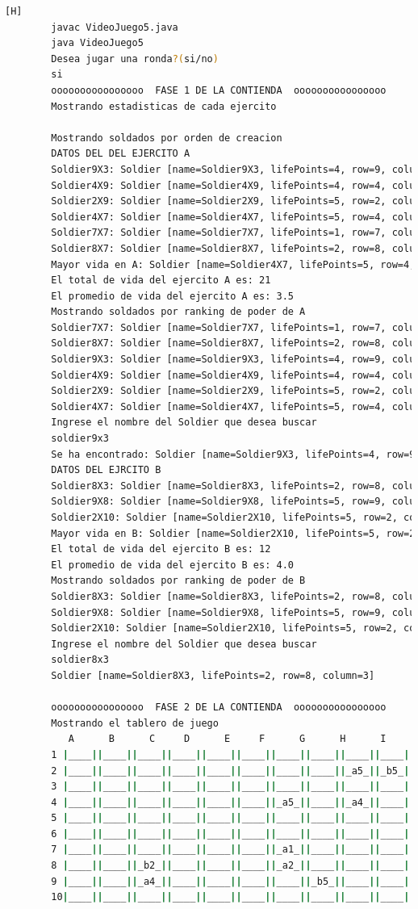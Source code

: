 \documentclass{article}
\begin{document}
		\begin{lstlisting}[language=bash,caption={Compilando y probando el codigo en su versión final }][H]
		javac VideoJuego5.java
		java VideoJuego5
		Desea jugar una ronda?(si/no)
		si
		oooooooooooooooo  FASE 1 DE LA CONTIENDA  oooooooooooooooo
		Mostrando estadisticas de cada ejercito
		
		Mostrando soldados por orden de creacion
		DATOS DEL DEL EJERCITO A
		Soldier9X3: Soldier [name=Soldier9X3, lifePoints=4, row=9, column=3]
		Soldier4X9: Soldier [name=Soldier4X9, lifePoints=4, row=4, column=9]
		Soldier2X9: Soldier [name=Soldier2X9, lifePoints=5, row=2, column=9]
		Soldier4X7: Soldier [name=Soldier4X7, lifePoints=5, row=4, column=7]
		Soldier7X7: Soldier [name=Soldier7X7, lifePoints=1, row=7, column=7]
		Soldier8X7: Soldier [name=Soldier8X7, lifePoints=2, row=8, column=7]
		Mayor vida en A: Soldier [name=Soldier4X7, lifePoints=5, row=4, column=7]
		El total de vida del ejercito A es: 21
		El promedio de vida del ejercito A es: 3.5
		Mostrando soldados por ranking de poder de A
		Soldier7X7: Soldier [name=Soldier7X7, lifePoints=1, row=7, column=7]
		Soldier8X7: Soldier [name=Soldier8X7, lifePoints=2, row=8, column=7]
		Soldier9X3: Soldier [name=Soldier9X3, lifePoints=4, row=9, column=3]
		Soldier4X9: Soldier [name=Soldier4X9, lifePoints=4, row=4, column=9]
		Soldier2X9: Soldier [name=Soldier2X9, lifePoints=5, row=2, column=9]
		Soldier4X7: Soldier [name=Soldier4X7, lifePoints=5, row=4, column=7]
		Ingrese el nombre del Soldier que desea buscar
		soldier9x3
		Se ha encontrado: Soldier [name=Soldier9X3, lifePoints=4, row=9, column=3]
		DATOS DEL EJRCITO B
		Soldier8X3: Soldier [name=Soldier8X3, lifePoints=2, row=8, column=3]
		Soldier9X8: Soldier [name=Soldier9X8, lifePoints=5, row=9, column=8]
		Soldier2X10: Soldier [name=Soldier2X10, lifePoints=5, row=2, column=10]
		Mayor vida en B: Soldier [name=Soldier2X10, lifePoints=5, row=2, column=10]
		El total de vida del ejercito B es: 12
		El promedio de vida del ejercito B es: 4.0
		Mostrando soldados por ranking de poder de B
		Soldier8X3: Soldier [name=Soldier8X3, lifePoints=2, row=8, column=3]
		Soldier9X8: Soldier [name=Soldier9X8, lifePoints=5, row=9, column=8]
		Soldier2X10: Soldier [name=Soldier2X10, lifePoints=5, row=2, column=10]
		Ingrese el nombre del Soldier que desea buscar
		soldier8x3
		Soldier [name=Soldier8X3, lifePoints=2, row=8, column=3]
		
		oooooooooooooooo  FASE 2 DE LA CONTIENDA  oooooooooooooooo
		Mostrando el tablero de juego
		   A      B      C     D      E     F      G      H      I     J
		1 |____||____||____||____||____||____||____||____||____||____|
		2 |____||____||____||____||____||____||____||____||_a5_||_b5_|
		3 |____||____||____||____||____||____||____||____||____||____|
		4 |____||____||____||____||____||____||_a5_||____||_a4_||____|
		5 |____||____||____||____||____||____||____||____||____||____|
		6 |____||____||____||____||____||____||____||____||____||____|
		7 |____||____||____||____||____||____||_a1_||____||____||____|
		8 |____||____||_b2_||____||____||____||_a2_||____||____||____|
		9 |____||____||_a4_||____||____||____||____||_b5_||____||____|
		10|____||____||____||____||____||____||____||____||____||____|
		

\end{lstlisting}
\end{document}
